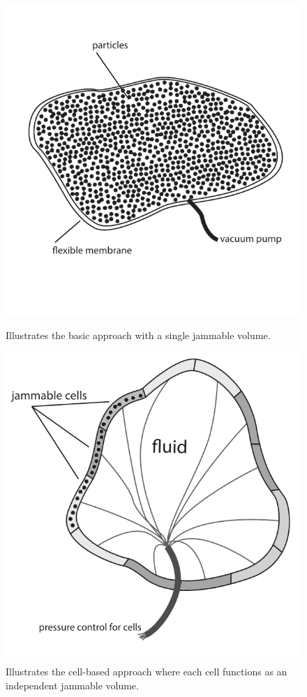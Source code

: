 \begin{figure}
  \centering
  \begin{minipage}[t]{.45\textwidth}
    \centering
    \includegraphics[width=.9\linewidth]{figures/jamming/basic_jamming}
    \caption[The basic jamming approach.]
    {Illustrates the basic approach with a single jammable volume.}
    \label{fig:ch:jamming:approaches:basic}
  \end{minipage}%
  \hspace{0.5cm}
  \begin{minipage}[t]{.45\textwidth}
    \centering
    \includegraphics[width=.9\linewidth]{figures/jamming/cell_jamming}
    \caption[The cell-based jamming approach.]
    {Illustrates the cell-based approach where each cell functions as an independent jammable volume.}
    \label{fig:ch:jamming:approaches:cell}
  \end{minipage}
\end{figure}

